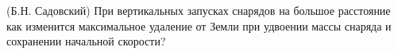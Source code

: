 (Б.Н. Садовский)
При вертикальных запусках снарядов на большое расстояние как изменится
максимальное удаление от Земли при удвоении массы снаряда и
сохранении начальной скорости?
